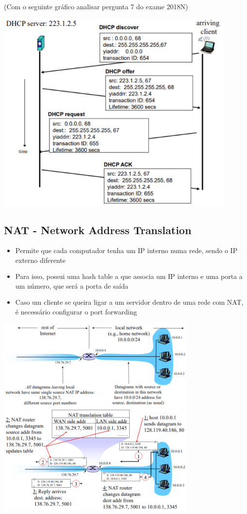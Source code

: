 \documentclass[../resumosRCOM.tex]{subfiles}
\begin{document}
(Com o seguinte gráfico analisar pergunta 7 do exame 2018N)
\begin{center}
    \includegraphics[width=12cm]{images/RCOM26.png}
\end{center}

\subsection{NAT - Network Address Translation}
\begin{itemize}
    \item Permite que cada computador tenha um IP interno numa rede, sendo o IP externo diferente
    \item Para isso, possui uma hash table a que associa um IP interno e uma porta a um número, que será a porta de saída
    \item Caso um cliente se queira ligar a um servidor dentro de uma rede com NAT, é necessário configurar o port forwarding

\end{itemize}
\begin{center}
    \includegraphics[width=10cm]{images/RCOM27.png}
    \includegraphics[width=10cm]{images/RCOM28.png}
\end{center}
\end{document}
